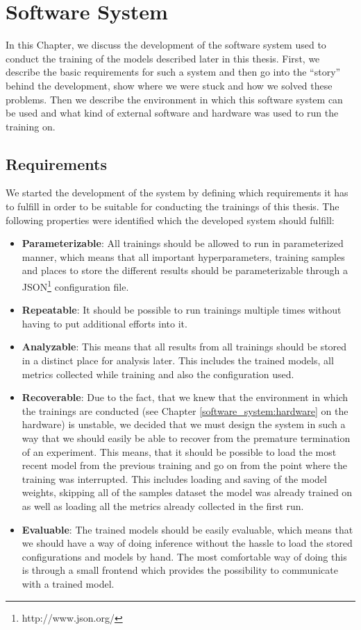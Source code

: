 \chapter{Software System}
\label{software_system}
In this Chapter, we discuss the development of the software system used to conduct the training of the models described later in this thesis. First, we describe the basic requirements for such a system and then go into the ``story'' behind the development, show where we were stuck and how we solved these problems. Then we describe the environment in which this software system can be used and what kind of external software and hardware was used to run the training on.

\section{Requirements}
We started the development of the system by defining which requirements it has to fulfill in order to be suitable for conducting the trainings of this thesis. The following properties were identified which the developed system should fulfill:

\begin{itemize}
	\item \textbf{Parameterizable}: All trainings should be allowed to run in parameterized manner, which means that all important hyperparameters, training samples and places to store the different results should be parameterizable through a JSON\footnote{http://www.json.org/} configuration file.
	\item \textbf{Repeatable}: It should be possible to run trainings multiple times without having to put additional efforts into it.
	\item \textbf{Analyzable}: This means that all results from all trainings should be stored in a distinct place for analysis later. This includes the trained models, all metrics collected while training and also the configuration used.
	\item \textbf{Recoverable}: Due to the fact, that we knew that the environment in which the trainings are conducted (see Chapter \ref{software_system:hardware} on the hardware) is unstable, we decided that we must design the system in such a way that we should easily be able to recover from the premature termination of an experiment. This means, that it should be possible to load the most recent model from the previous training and go on from the point where the training was interrupted. This includes loading and saving of the model weights, skipping all of the samples dataset the model was already trained on as well as loading all the metrics already collected in the first run.
	\item \textbf{Evaluable}: The trained models should be easily evaluable, which means that we should have a way of doing inference without the hassle to load the stored configurations and models by hand. The most comfortable way of doing this is through a small frontend which provides the possibility to communicate with a trained model.
\end{itemize}

